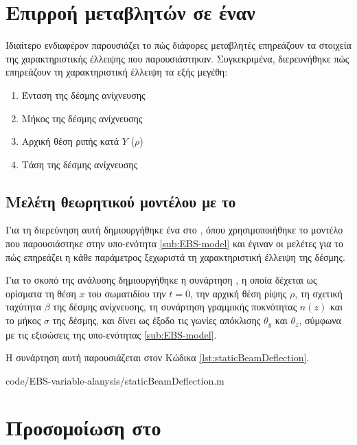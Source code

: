 \section{Επιρροή μεταβλητών σε έναν }

Ιδιαίτερο ενδιαφέρον παρουσιάζει το πώς διάφορες μεταβλητές επηρεάζουν τα στοιχεία της χαρακτηριστικής έλλειψης που παρουσιάστηκαν.
Συγκεκριμένα, διερευνήθηκε πώς επηρεάζουν τη χαρακτηριστική έλλειψη τα εξής μεγέθη:
\begin{enumerate}
	\item Ένταση της δέσμης ανίχνευσης
	\item Μήκος της δέσμης ανίχνευσης
	\item Αρχική θέση ριπής κατά $Y$ ($\rho$) 
	\item Τάση της δέσμης ανίχνευσης
\end{enumerate}

\subsection{Μελέτη θεωρητικού μοντέλου με το } \label{sub:variable-analysis-MATLAB}
Για τη διερεύνηση αυτή δημιουργήθηκε ένα  στο , όπου χρησιμοποιήθηκε το μοντέλο που παρουσιάστηκε στην υπο-ενότητα \ref{sub:EBS-model} και έγιναν οι μελέτες για το πώς επηρεάζει η κάθε παράμετρος ξεχωριστά τη χαρακτηριστική έλλειψη της δέσμης. 

Για το σκοπό της ανάλυσης δημιουργήθηκε η συνάρτηση , η οποία δέχεται ως ορίσματα τη θέση $x$ του σωματιδίου την $t = 0$, την αρχική θέση ρίψης $\rho$, τη σχετική ταχύτητα $\beta$ της δέσμης ανίχνευσης, τη συνάρτηση γραμμικής πυκνότητας $n(z)$ και το μήκος $\sigma$ της δέσμης, και δίνει ως έξοδο τις γωνίες απόκλισης $\theta_y$ και $\theta_z$, σύμφωνα με τις εξισώσεις της υπο-ενότητας \ref{sub:EBS-model}.

Η συνάρτηση αυτή παρουσιάζεται στον Κώδικα \ref{lst:staticBeamDeflection}.


{code/EBS-variable-alanysis/staticBeamDeflection.m}

\section{Προσομοίωση  στο }

